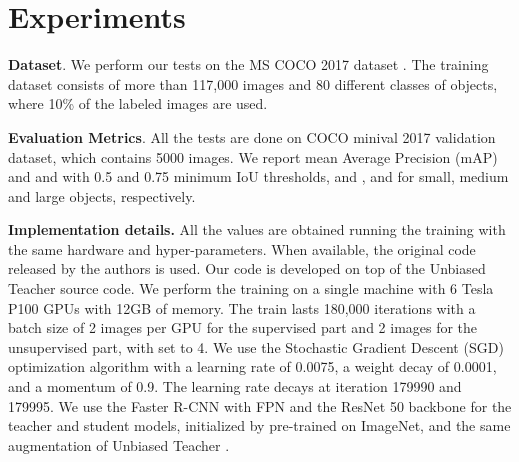 \section{Experiments}
\label{experiments}

\noindent\textbf{Dataset}.
We perform our tests on the MS COCO 2017 dataset \cite{lin2014microsoft}.
The training dataset consists of more than 117,000 images and 80 different classes of objects, where 10\% of the labeled images are used.

\noindent\textbf{Evaluation Metrics}.
All the tests are done on COCO minival 2017 validation dataset, which contains 5000 images.
We report mean Average Precision (mAP) and  and  with 0.5 and 0.75 minimum IoU thresholds, and ,  and  for small, medium and large objects, respectively.

\noindent\textbf{Implementation details.}
All the values are obtained running the training with the same hardware and hyper-parameters.
When available, the original code released by the authors is used.
Our code is developed on top of the Unbiased Teacher \cite{liu2021unbiased} source code.
We perform the training on a single machine with 6 Tesla P100 GPUs with 12GB of memory.
The train lasts 180,000 iterations with a batch size of 2 images per GPU for the supervised part and 2 images for the unsupervised part, with  set to 4.
We use the Stochastic Gradient Descent (SGD) optimization algorithm with a learning rate of 0.0075, a weight decay of 0.0001, and a momentum of 0.9.
The learning rate decays at iteration 179990 and 179995.
We use the Faster R-CNN with FPN \cite{lin2017feature} and the ResNet 50 \cite{he2016deep} backbone for the teacher and student models, initialized by pre-trained on ImageNet, and the same augmentation of Unbiased Teacher \cite{liu2021unbiased}.

